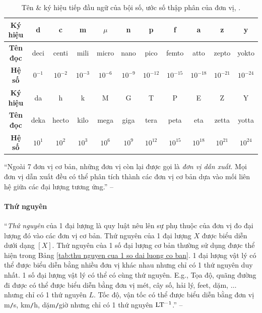 \documentclass{article}
\numberwithin{equation}{section}
\begin{document}
\begin{table}[H]
	\centering
	\begin{tabular}{|c|c|c|c|c|c|c|c|c|c|c|}
		\hline
		\textbf{Ký hiệu} & d & c & m & $\mu$ & n & p & f & a & z & y \\
		\hline
		\textbf{Tên đọc} & deci & centi & mili & micro & nano & pico & femto & atto & zepto & yokto \\
		\hline
		\textbf{Hệ số} & $0^{-1}$ & $10^{-2}$ & $10^{-3}$ & $10^{-6}$ & $10^{-9}$ & $10^{-12}$ & $10^{-15}$ & $10^{-18}$ & $10^{-21}$ & $10^{-24}$ \\
		\hline
		\textbf{Ký hiệu} & da & h & k & M & G & T & P & E & Z & Y \\
		\hline
		\textbf{Tên đọc} & deka & hecto & kilo & mega & giga & tera & peta & eta & zetta & yotta \\
		\hline
		\textbf{Hệ số} & $10^1$ & $10^2$ & $10^3$ & $10^6$ & $10^9$ & $10^{12}$ & $10^{15}$ & $10^{18}$ & $10^{21}$ & $10^{24}$ \\
		\hline
	\end{tabular}
	\caption{Tên \& ký hiệu tiếp đầu ngữ của bội số, ước số thập phân của đơn vị, \cite[Bảng 3.2, p. 16]{SGK_Vat_Ly_10_Chan_Troi_Sang_Tao}.}
	\label{tab:ten & ky hieu tiep dau ngu cua boi so, uoc so thap phan cua don vi}
\end{table}
``Ngoài 7 đơn vị cơ bản, những đơn vị còn lại được gọi là \textit{đơn vị dẫn xuất}. Mọi đơn vị dẫn xuất đều có thể phân tích thành các đơn vị cơ bản dựa vào mối liên hệ giữa các đại lượng tương ứng.'' -- \cite[p. 16]{SGK_Vat_Ly_10_Chan_Troi_Sang_Tao}

\paragraph{Thứ nguyên}
``\textit{Thứ nguyên} của 1 đại lượng là quy luật nêu lên sự phụ thuộc của đơn vị đo đại lượng đó vào các đơn vị cơ bản. Thứ nguyên của 1 đại lượng $X$ được biểu diễn dưới dạng $[X]$. Thứ nguyên của 1 số đại lượng cơ bản thường sử dụng được thể hiện trong Bảng \ref{tab:thu nguyen cua 1 so dai luong co ban}. 1 đại lượng vật lý có thể được biểu diễn bằng nhiều đơn vị khác nhau nhưng chỉ có 1 thứ nguyên duy nhất. 1 số đại lượng vật lý có thể có cùng thứ nguyên. E.g., Tọa độ, quãng đường đi được có thể được biểu diễn bằng đơn vị mét, cây số, hải lý, feet, dặm, $\ldots$ nhưng chỉ có 1 thứ nguyên $L$. Tốc độ, vận tốc có thể được biểu diễn bằng đơn vị m\texttt{/}s, km\texttt{/}h, dặm\texttt{/}giờ nhưng chỉ có 1 thứ nguyên $\rm LT^{-1}$.'' -- \cite[p. 16]{SGK_Vat_Ly_10_Chan_Troi_Sang_Tao}
\end{document}
